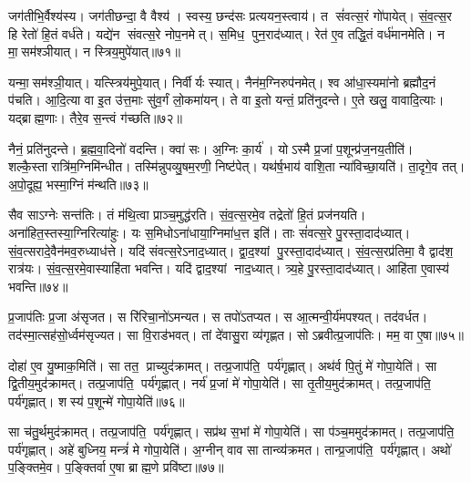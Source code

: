 जग॑तीभि॒र्वैश्य॑स्य।
जग॑तीछन्दा॒ वै वैश्य॑।
स्वस्य॒ छन्द॑सः प्रत्ययन॒स्त्वाय॑।
त सं॑वत्स॒रं गो॑पायेत्।
सं॒व॒त्स॒र हि रेतो॑ हि॒तं वर्ध॑ते।
यद्ये॑न संवत्स॒रे नोप॒नमेत्।
स॒मिध॒ पुन॒राद॑ध्यात्।
रेत॑ ए॒व तद्धि॒तं वर्ध॑मानमेति।
न मा॒सम॑श्ञीयात्।
न स्त्रिय॒मुपे॑यात्॥७१॥

यन्मा॒सम॑श्ञी॒यात्।
यत्स्त्रिय॑मुपे॒यात्।
निर्वीर्यः स्यात्।
नैन॑म॒ग्निरुप॑नमेत्।
श्व आ॑धा॒स्यमा॑नो ब्रह्मौद॒नं प॑चति।
आ॒दि॒त्या वा इ॒त उ॑त्त॒माः सु॑व॒र्गं लो॒कमा॑यन्।
ते वा इ॒तो यन्तं॒ प्रति॑नुदन्ते।
ए॒ते खलु॒ वावादि॒त्याः।
यद्ब्राह्म॒णाः।
तैरे॒व स॒न्त्वं ग॑च्छति॥७२॥

नैनं॒ प्रति॑नुदन्ते।
ब्र॒ह्म॒वा॒दिनो॑ वदन्ति।
क्वा॑ सः।
अ॒ग्निः का॒र्य॑।
योऽस्मै प्र॒जां प॒शून्प्र॑ज॒नय॒तीति॑।
शल्कै॒स्तारात्रि॑म॒ग्निमि॑न्धीत।
तस्मि॑न्नुपव्यु॒षम॒रणी॒ निष्ट॑पेत्।
यथ॑र्\mbox{}ष॒भाय॑ वाशि॒ता न्या॑विच्छा॒यति॑।
ता॒दृगे॒व तत्।
अ॒पो॒दूह्य॒ भस्मा॒ग्निं म॑न्थति॥७३॥

सैव साऽग्नेः सन्त॑तिः।
तं म॑थि॒त्वा प्राञ्च॒मुद्ध॑रति।
सं॒व॒त्स॒रमे॒व तद्रेतो॑ हि॒तं प्रज॑नयति।
अना॑हित॒स्तस्या॒ग्निरित्या॑हुः।
यः स॒मिधोऽना॑धाया॒ग्निमा॑ध॒त्त इति॑।
ताः सं॑वत्स॒रे पु॒रस्ता॒दाद॑ध्यात्।
सं॒व॒त्सरादे॒वैन॑मव॒रुध्याध॑त्ते।
यदि॑ संवत्स॒रेऽनाद॒ध्यात्।
द्वा॒द॒श्यां पु॒रस्ता॒दाद॑ध्यात्।
सं॒व॒त्स॒रप्र॑तिमा॒ वै द्वाद॑श॒ रात्र॑यः।
सं॒व॒त्स॒रमे॒वास्याहि॑ता भवन्ति।
यदि॑ द्वाद॒श्यां नाद॒ध्यात्।
त्र्य॒हे पु॒रस्ता॒दाद॑ध्यात्।
आहि॑ता ए॒वास्य॑ भवन्ति॥७४॥

प्र॒जाप॑तिः प्र॒जा अ॑सृजत।
स रि॑रिचा॒नो॑ऽमन्यत।
स तपो॑ऽतप्यत।
स आ॒त्मन्वी॒र्य॑मपश्यत्।
तद॑वर्धत।
तद॑स्मा॒त्सह॑सो॒र्ध्वम॑सृज्यत।
सा वि॒राड॑भवत्।
तां दे॑वासु॒रा व्य॑गृह्णत।
सोऽब्रवीत्प्र॒जाप॑तिः।
मम॒ वा ए॒षा॥७५॥

दोहा॑ ए॒व यु॒ष्माक॒मिति॑।
सा तत॒ प्राच्युद॑क्रामत्।
तत्प्र॒जाप॑ति॒ पर्य॑गृह्णात्।
अथ॑र्व पि॒तुं मे॑ गोपा॒येति॑।
सा द्वि॒तीय॒मुद॑क्रामत्।
तत्प्र॒जाप॑ति॒ पर्य॑गृह्णात्।
नर्य॑ प्र॒जां मे॑ गोपा॒येति॑।
सा तृ॒तीय॒मुद॑क्रामत्।
तत्प्र॒जाप॑ति॒ पर्य॑गृह्णात्।
शस्य॑ प॒शून्मे॑ गोपा॒येति॑॥७६॥

सा च॑तु॒र्थमुद॑क्रामत्।
तत्प्र॒जाप॑ति॒ पर्य॑गृह्णात्।
सप्र॑थ स॒भां मे॑ गोपा॒येति॑।
सा प॑ञ्च॒ममुद॑क्रामत्।
तत्प्र॒जाप॑ति॒ पर्य॑गृह्णात्।
अहे॑ बुध्निय॒ मन्त्रं॑ मे गोपा॒येति॑।
अ॒ग्नीन् वाव सा तान्व्य॑क्रमत।
तान्प्र॒जाप॑ति॒ पर्य॑गृह्णात्।
अथो॑ प॒ङ्क्तिमे॒व।
प॒ङ्क्तिर्वा ए॒षा ब्राह्म॒णे प्रवि॑ष्टा॥७७॥

